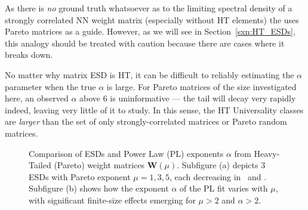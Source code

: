 As there is \emph{no} ground truth whatsoever as to the limiting spectral density of a strongly correlated NN weight matrix
(especially without HT elements)
the \HTSR \Phenomenology uses Pareto matrices as  a guide. 
However, as we will see in Section~\ref{sxn:HT_ESDs}, this analogy should be treated with caution because there are 
cases where it breaks down.

No matter why matrix ESD is HT, it can be difficult to reliably estimating the $\alpha$ parameter when
the true $\alpha$ is large. For Pareto matrices of the size investigated here, 
an observed $\alpha$ above $6$ is uninformative --- the tail will decay very rapidly indeed,
leaving very little of it to study.
In this sense, the HT Universality classes are \emph{larger} than the set of only strongly-correlated 
matrices or Pareto random matrices.




\begin{figure}[h]
    \centering  
    \caption{Comparison of ESDs and Power Law (PL) exponents $\alpha$ from Heavy-Tailed (Pareto) 
weight matrices $\mathbf{W}(\mu)$. 
Subfigure (a) depicts 3 \Typical ESDs with Pareto exponent $\mu=1,3,5$, each decreasing in \SHAPE~and \SCALE.
Subfigure (b) shows how the exponent $\alpha$ of the PL fit varies with $\mu$, with significant finite-size
effects emerging for $\mu>2$ and $\alpha>2$.
}
   \label{fig:HT-esds}
\end{figure}

